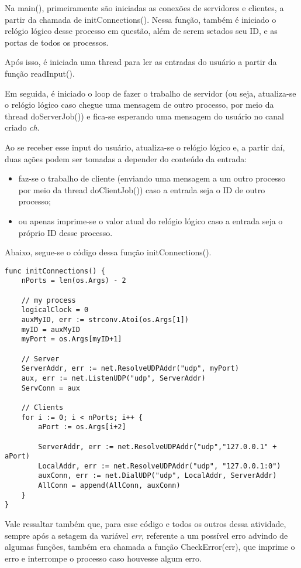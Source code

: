 \documentclass[conference]{IEEEtran}
\begin{document}
	Na main(), primeiramente são iniciadas as conexões de servidores e clientes, a partir da chamada de initConnections(). Nessa função, também é iniciado o relógio lógico desse processo em questão, além de serem setados seu ID, e as portas de todos os processos. 
	
	Após isso, é iniciada uma thread para ler as entradas do usuário a partir da função readInput().
	
	Em seguida, é iniciado o loop de fazer o trabalho de servidor (ou seja, atualiza-se o relógio lógico caso chegue uma mensagem de outro processo, por meio da thread doServerJob()) e fica-se esperando uma mensagem do usuário no canal criado \textit{ch}.
	
	Ao se receber esse input do usuário, atualiza-se o relógio lógico e, a partir daí, duas ações podem ser tomadas a depender do conteúdo da entrada: 
	
\begin{itemize}
\item faz-se o trabalho de cliente (enviando uma mensagem a um outro processo por meio da thread doClientJob()) caso a entrada seja o ID de outro processo;
\item ou apenas imprime-se o valor atual do relógio lógico caso a entrada seja o próprio ID desse processo.
\end{itemize}
	
	Abaixo, segue-se o código dessa função initConnections().
	
\begin{lstlisting}
func initConnections() {
	nPorts = len(os.Args) - 2

	// my process
	logicalClock = 0
	auxMyID, err := strconv.Atoi(os.Args[1])
	myID = auxMyID
	myPort = os.Args[myID+1]

	// Server
	ServerAddr, err := net.ResolveUDPAddr("udp", myPort)
	aux, err := net.ListenUDP("udp", ServerAddr)
	ServConn = aux

	// Clients
	for i := 0; i < nPorts; i++ {
		aPort := os.Args[i+2]
		
		ServerAddr, err := net.ResolveUDPAddr("udp","127.0.0.1" + aPort)
		LocalAddr, err := net.ResolveUDPAddr("udp", "127.0.0.1:0")
		auxConn, err := net.DialUDP("udp", LocalAddr, ServerAddr)
		AllConn = append(AllConn, auxConn)
	}
}
\end{lstlisting}

	Vale ressaltar também que, para esse código e todos os outros dessa atividade, sempre após a setagem da variável \textit{err}, referente a um possível erro advindo de algumas funções, também era chamada a função CheckError(err), que imprime o erro e interrompe o processo caso houvesse algum erro.
	
\end{document}
